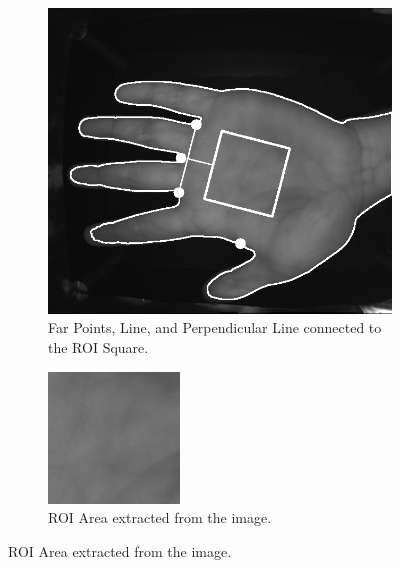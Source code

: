 \begin{enumerate}
    \begin{figure}[!ht]
        \centering
        \begin{subfigure}[t]{0.48\columnwidth}
            \includegraphics[width=\textwidth]{./images/preprocessing/far_points_line_perpendicular_square_image.png}
            \caption{Far Points, Line, and Perpendicular Line connected to the ROI Square.}
            \label{fig:far_points_line_perpendicular_square_image}
        \end{subfigure}
        \hfill
        \begin{subfigure}[t]{0.48\columnwidth}
            \includegraphics[width=\textwidth]{./images/preprocessing/rectified_image.png}
            \caption{ROI Area extracted from the image.}
            \label{fig:rectified_image}
        \end{subfigure}
    \end{figure}


\end{enumerate}

